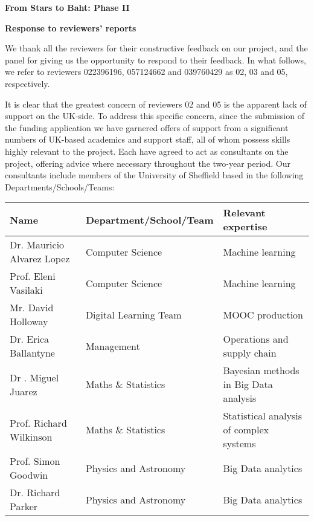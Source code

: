 \documentclass[11pt]{article}
\begin{document}
\setcounter{figure}{0}
\noindent
{\large \bf From Stars to Baht: Phase II}

\noindent
{\large \bf Response to reviewers' reports}

\vspace{2mm}
\noindent
We thank all the reviewers for their constructive feedback on our project, and the panel for giving us the opportunity to respond to their feedback. In what follows, we refer to reviewers 022396196, 057124662 and 039760429 as 02, 03 and 05, respectively.

\vspace{2mm}
\noindent
It is clear that the greatest concern of reviewers 02 and 05 is the apparent lack of support on the UK-side. To address this specific concern, since the submission of the funding application we have garnered offers of support from a significant numbers of UK-based academics and support staff, all of whom possess skills highly relevant to the project. Each have agreed to act as consultants on the project, offering advice where necessary throughout the two-year period. Our consultants include members of the University of Sheffield based in the following Departments/Schools/Teams:
\begin{table}[h]
\begin{tabular}{lll}
  Name & Department/School/Team & Relevant expertise\\
  \hline
  Dr. Mauricio Alvarez Lopez & Computer Science & Machine learning \\
  Prof. Eleni Vasilaki & Computer Science & Machine learning\\
  Mr. David Holloway & Digital Learning Team & MOOC production \\
  Dr. Erica Ballantyne & Management & Operations and supply chain \\
  Dr . Miguel Juarez & Maths \& Statistics & Bayesian methods in Big Data analysis \\
  Prof. Richard Wilkinson & Maths \& Statistics & Statistical analysis of complex systems\\
  Prof. Simon Goodwin & Physics and Astronomy & Big Data analytics \\
  Dr. Richard Parker & Physics and Astronomy & Big Data analytics \\
\hline
\end{tabular}  
\end{table}  
\end{document}
